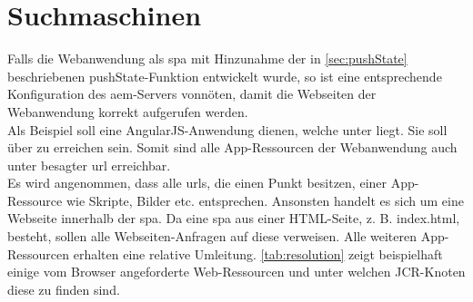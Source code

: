 \section{Suchmaschinen}
\label{sec:suchmaschinen}
Falls die Webanwendung als \ac{spa} mit Hinzunahme der in \autoref{sec:pushState} beschriebenen pushState-Funktion entwickelt wurde, so ist eine entsprechende Konfiguration des \ac{aem}-Servers vonnöten, damit die Webseiten der Webanwendung korrekt aufgerufen werden.\\
Als Beispiel soll eine AngularJS-Anwendung dienen, welche unter  liegt. Sie soll über  zu erreichen sein. Somit sind alle App-Ressourcen der Webanwendung auch unter besagter \ac{url} erreichbar. \\
Es wird angenommen, dass alle \ac{url}s, die einen Punkt besitzen, einer App-Ressource wie Skripte, Bilder etc. entsprechen. Ansonsten handelt es sich um eine Webseite innerhalb der \ac{spa}. Da eine \ac{spa} aus einer HTML-Seite, z. B. index.html, besteht, sollen alle Webseiten-Anfragen auf diese verweisen. Alle weiteren App-Ressourcen erhalten eine relative Umleitung. \autoref{tab:resolution} zeigt beispielhaft einige vom Browser angeforderte Web-Ressourcen und unter welchen JCR-Knoten diese zu finden sind. \\

